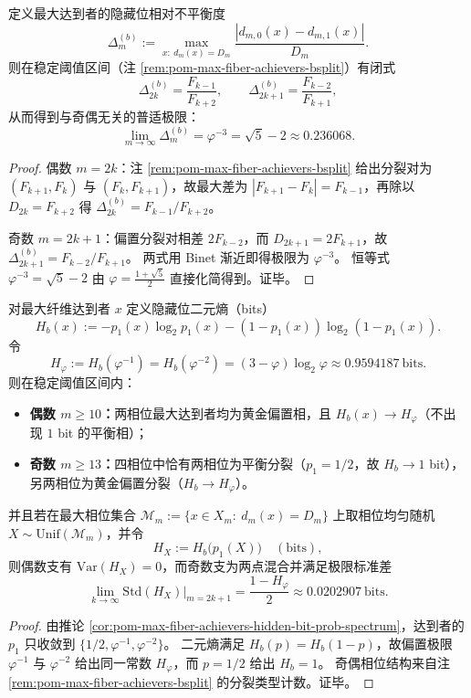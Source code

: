 \begin{corollary}\label{cor:pom-max-fiber-achievers-hidden-bit-imbalance}
定义最大达到者的隐藏位相对不平衡度
\[
\Delta_m^{(b)}:=\max_{x:\ d_m(x)=D_m}\frac{|d_{m,0}(x)-d_{m,1}(x)|}{D_m}.
\]
则在稳定阈值区间（注 \ref{rem:pom-max-fiber-achievers-bsplit}）有闭式
\[
\Delta_{2k}^{(b)}=\frac{F_{k-1}}{F_{k+2}},
\qquad
\Delta_{2k+1}^{(b)}=\frac{F_{k-2}}{F_{k+1}},
\]
从而得到与奇偶无关的普适极限：
\[
\boxed{\;
\lim_{m\to\infty}\Delta_m^{(b)}=\varphi^{-3}=\sqrt5-2\approx 0.236068.
\;}
\]
\end{corollary}
\begin{proof}
偶数 \(m=2k\)：注 \ref{rem:pom-max-fiber-achievers-bsplit} 给出分裂对为 \((F_{k+1},F_k)\) 与 \((F_k,F_{k+1})\)，故最大差为 \(|F_{k+1}-F_k|=F_{k-1}\)，再除以 \(D_{2k}=F_{k+2}\) 得 \(\Delta_{2k}^{(b)}=F_{k-1}/F_{k+2}\)。
\par
奇数 \(m=2k+1\)：偏置分裂对相差 \(2F_{k-2}\)，而 \(D_{2k+1}=2F_{k+1}\)，故 \(\Delta_{2k+1}^{(b)}=F_{k-2}/F_{k+1}\)。
两式用 Binet 渐近即得极限为 \(\varphi^{-3}\)。
恒等式 \(\varphi^{-3}=\sqrt5-2\) 由 \(\varphi=\frac{1+\sqrt5}{2}\) 直接化简得到。证毕。
\end{proof}


\begin{corollary}\label{cor:pom-max-fiber-achievers-hidden-bit-entropy}
对最大纤维达到者 \(x\) 定义隐藏位二元熵（bits）
\[
H_b(x):=-p_1(x)\log_2 p_1(x)-(1-p_1(x))\log_2(1-p_1(x)).
\]
令
\[
H_\varphi:=H_b(\varphi^{-1})=H_b(\varphi^{-2})=(3-\varphi)\log_2\varphi\approx 0.9594187\ \text{bits}.
\]
则在稳定阈值区间内：
\begin{itemize}
  \item \textbf{偶数 \(m\ge 10\)：}两相位最大达到者均为黄金偏置相，且 \(H_b(x)\to H_\varphi\)（不出现 \(1\) bit 的平衡相）；
  \item \textbf{奇数 \(m\ge 13\)：}四相位中恰有两相位为平衡分裂（\(p_1=1/2\)，故 \(H_b\to 1\) bit），另两相位为黄金偏置分裂（\(H_b\to H_\varphi\)）。
\end{itemize}
并且若在最大相位集合 \(\mathcal{M}_m:=\{x\in X_m:\ d_m(x)=D_m\}\) 上取相位均匀随机 \(X\sim\mathrm{Unif}(\mathcal{M}_m)\)，并令
\[
H_X:=H_b\!\bigl(p_1(X)\bigr)\quad(\text{bits}),
\]
则偶数支有 \(\mathrm{Var}(H_X)=0\)，而奇数支为两点混合并满足极限标准差
\[
\lim_{k\to\infty}\mathrm{Std}(H_X)\big|_{m=2k+1}=\frac{1-H_\varphi}{2}\approx 0.0202907\ \text{bits}.
\]
\end{corollary}
\begin{proof}
由推论 \ref{cor:pom-max-fiber-achievers-hidden-bit-prob-spectrum}，达到者的 \(p_1\) 只收敛到 \(\{1/2,\varphi^{-1},\varphi^{-2}\}\)。
二元熵满足 \(H_b(p)=H_b(1-p)\)，故偏置极限 \(\varphi^{-1}\) 与 \(\varphi^{-2}\) 给出同一常数 \(H_\varphi\)，而 \(p=1/2\) 给出 \(H_b=1\)。
奇偶相位结构来自注 \ref{rem:pom-max-fiber-achievers-bsplit} 的分裂类型计数。证毕。
\end{proof}

